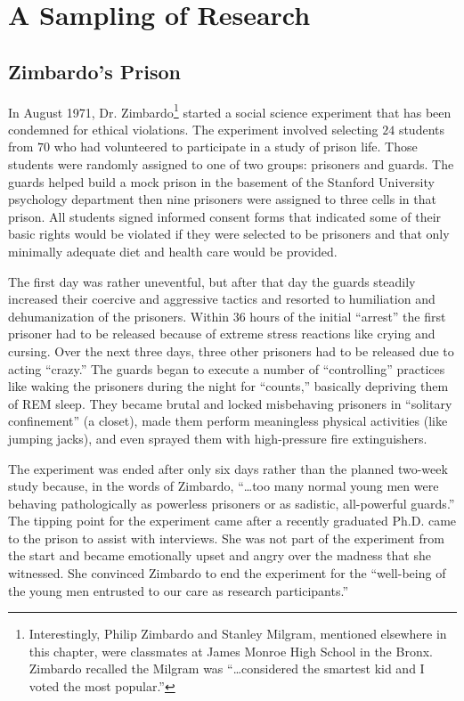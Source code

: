 \section{A Sampling of Research}

\subsection{Zimbardo's Prison}

In August 1971, Dr. Zimbardo\footnote{Interestingly, Philip Zimbardo and Stanley Milgram, mentioned elsewhere in this chapter, were classmates at James Monroe High School in the Bronx. Zimbardo recalled the Milgram was ``\ldots considered the smartest kid and I voted the most popular.''\cite{zimbardo2000reflections}} started a social science experiment that has been condemned for ethical violations\cite{zimbardo2000reflections}. The experiment involved selecting $ 24 $ students from $ 70 $ who had volunteered to participate in a study of prison life. Those students were randomly assigned to one of two groups: prisoners and guards. The guards helped build a mock prison in the basement of the Stanford University psychology department then nine prisoners were assigned to three cells in that prison. All students signed informed consent forms that indicated some of their basic rights would be violated if they were selected to be prisoners and that only minimally adequate diet and health care would be provided. 

The first day was rather uneventful, but after that day the guards steadily increased their coercive and aggressive tactics and resorted to humiliation and dehumanization of the prisoners. Within $ 36 $ hours of the initial ``arrest'' the first prisoner had to be released because of extreme stress reactions like crying and cursing. Over the next three days, three other prisoners had to be released due to acting ``crazy.'' The guards began to execute a number of ``controlling'' practices like waking the prisoners during the night for ``counts,'' basically depriving them of REM sleep. They became brutal and locked misbehaving prisoners in ``solitary confinement'' (a closet), made them perform meaningless physical activities (like jumping jacks), and even sprayed them with high-pressure fire extinguishers.

The experiment was ended after only six days rather than the planned two-week study because, in the words of Zimbardo, ``\ldots too many normal young men were behaving pathologically as powerless prisoners or as sadistic, all-powerful guards.'' The tipping point for the experiment came after a recently graduated Ph.D. came to the prison to assist with interviews. She was not part of the experiment from the start and became emotionally upset and angry over the madness that she witnessed. She convinced Zimbardo to end the experiment for the ``well-being of the young men entrusted to our care as research participants.'' 

